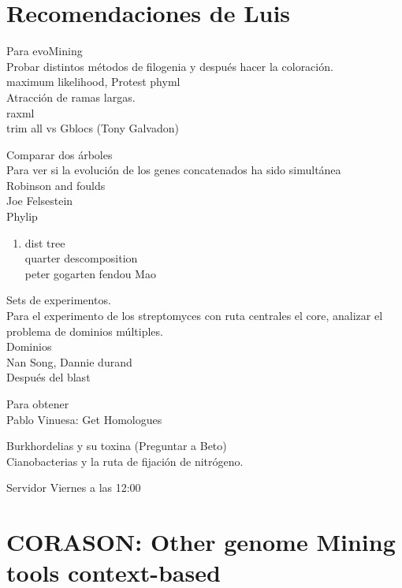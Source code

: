 \documentclass[12pt,twoside]{reedthesis}
\providecommand{\tightlist}{%
  \setlength{\itemsep}{0pt}\setlength{\parskip}{0pt}}
\begin{document}
  \section{Recomendaciones de Luis}\label{recomendaciones-de-luis}
  
  Para evoMining\\
  Probar distintos métodos de filogenia y después hacer la coloración.\\
  maximum likelihood, Protest phyml\\
  Atracción de ramas largas.\\
  raxml\\
  trim all vs Gblocs (Tony Galvadon)
  
  Comparar dos árboles\\
  Para ver si la evolución de los genes concatenados ha sido simultánea\\
  Robinson and foulds\\
  Joe Felsestein\\
  Phylip
  
  \begin{enumerate}
  \def\labelenumi{\arabic{enumi}.}
  \setcounter{enumi}{1}
  \tightlist
  \item
    dist tree\\
    quarter descomposition\\
    peter gogarten fendou Mao
  \end{enumerate}
  
  Sets de experimentos.\\
  Para el experimento de los streptomyces con ruta centrales el core,
  analizar el problema de dominios múltiples.\\
  Dominios\\
  Nan Song, Dannie durand\\
  Después del blast
  
  Para obtener\\
  Pablo Vinuesa: Get Homologues
  
  Burkhordelias y su toxina (Preguntar a Beto)\\
  Cianobacterias y la ruta de fijación de nitrógeno.
  
  Servidor Viernes a las 12:00
  
  \section{CORASON: Other genome Mining tools
  context-based}\label{corason-other-genome-mining-tools-context-based}
  
\end{document}
